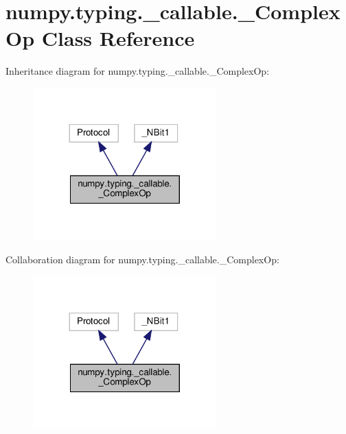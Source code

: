 \hypertarget{classnumpy_1_1typing_1_1__callable_1_1__ComplexOp}{}\section{numpy.\+typing.\+\_\+callable.\+\_\+\+Complex\+Op Class Reference}
\label{classnumpy_1_1typing_1_1__callable_1_1__ComplexOp}


Inheritance diagram for numpy.\+typing.\+\_\+callable.\+\_\+\+Complex\+Op\+:
\nopagebreak
\begin{figure}[H]
\begin{center}
\leavevmode
\includegraphics[width=200pt]{classnumpy_1_1typing_1_1__callable_1_1__ComplexOp__inherit__graph}
\end{center}
\end{figure}


Collaboration diagram for numpy.\+typing.\+\_\+callable.\+\_\+\+Complex\+Op\+:
\nopagebreak
\begin{figure}[H]
\begin{center}
\leavevmode
\includegraphics[width=200pt]{classnumpy_1_1typing_1_1__callable_1_1__ComplexOp__coll__graph}
\end{center}
\end{figure}
